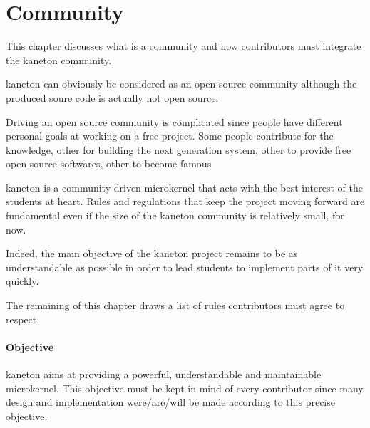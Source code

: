 %
%
%
%
%
%

%
%

\chapter{Community}
\label{chapter:community}

This chapter discusses what is a community and how contributors must integrate
the kaneton community.

\newpage

%
%

kaneton can obviously be considered as an open source community although the
produced soure code is actually not open source.

Driving an open source community is complicated since people have different
personal goals at working on a free project. Some people contribute for
the knowledge, other for building the next generation system, other to
provide free open source softwares, other to become famous \etc{}

kaneton is a community driven microkernel that acts with the best interest of
the students at heart. Rules and regulations that keep the project moving
forward are fundamental even if the size of the kaneton community is
relatively small, for now.

Indeed, the main objective of the kaneton project remains to be as
understandable as possible in order to lead students to implement parts of
it very quickly.

The remaining of this chapter draws a list of rules contributors must agree
to respect.


\subsubsection{Objective}

kaneton aims at providing a powerful, understandable and maintainable
microkernel. This objective must be kept in mind of every contributor
since many design and implementation were/are/will be made according to
this precise objective.

